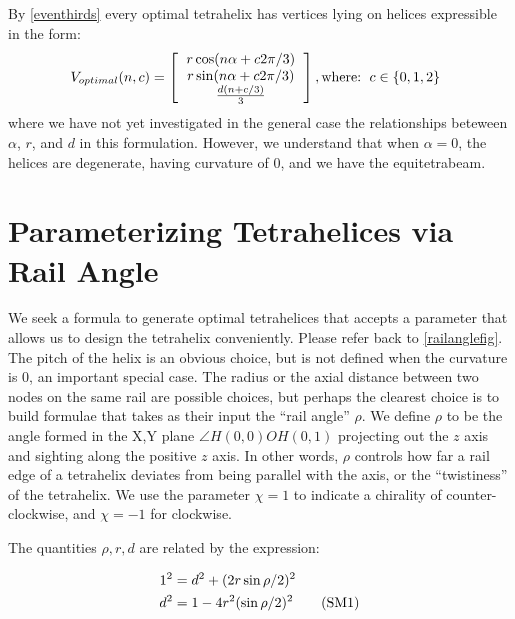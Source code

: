 \documentclass[review]{siamonline1116}
\newcommand\numberthis{\addtocounter{equation}{1}\tag{\theequation}}
\begin{document}
By \cref{eventhirds} every optimal tetrahelix has vertices lying on helices expressible in the form:
\[
V_{optimal}(n,c) =
\left [
  \begin{tabular}{c}
   $ r \cos(n \alpha +  c 2 \pi /3)$\\
   $ r \sin(n \alpha +  c 2 \pi /3) $\\
   $ \frac{d(n +c / 3)}{3}   $
  \end{tabular}
  \right ],
\text{where:}
\begin{tabular}{c}
  $c \in \{0,1,2\}$
  \end{tabular}      
\]
where we have not yet investigated in the general case the relationships beteween $\alpha$, $r$, and $d$ in this formulation.
However, we understand that when $\alpha = 0$, the helices are degenerate, having curvature of $0$, and
we have the equitetrabeam.




\section{Parameterizing Tetrahelices via Rail Angle}

We seek a formula to generate optimal tetrahelices that accepts a
parameter that allows us to design the tetrahelix conveniently.
Please refer back to \cref{railanglefig}.
The pitch of the helix is an obvious choice, but is not defined when the
curvature is $0$, an important special case. The radius or the axial
distance between two nodes on the same rail are possible choices, but
perhaps the clearest choice is to build formulae that takes as their
input the ``rail angle'' $\rho$. We define $\rho$ to be the angle
formed in the X,Y plane $\angle H(0,0) O H(0,1)$ projecting out the $z$
axis and sighting along the positive $z$ axis. In other words, $\rho$
controls how far a rail edge of a tetrahelix deviates from being
parallel with the axis, or the ``twistiness'' of the tetrahelix. We use
the parameter $\chi = 1$ to indicate a chirality of counter-clockwise,
and $\chi = -1$ for clockwise.



 The quantities $\rho,r,d$ are related by the expression:

\begin{align*}
  1^2 &= d^2 + (2 r \sin{ \rho / 2})^2 \\
  d^2 &= 1 - 4 r^2 (\sin{ \rho / 2})^2    \numberthis  \label{railangle} \\
\end{align*}
\end{document}
